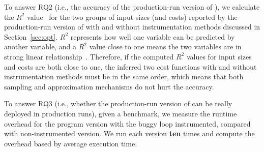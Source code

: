 To answer RQ2 (i.e., the accuracy of the production-run version of \Tool),
we calculate the $R^2$ value~\cite{rsquare} 
for the two groups of input sizes (and costs) reported by 
the production-run version of \Tool with and without 
instrumentation methods discussed in Section~\ref{sec:opt}.
$R^2$ represents how well one variable can be predicted by another variable,
and a $R^2$ value close to one means the two variables are 
in strong linear relationship~\cite{rsquare-value}.
Therefore, if the computed $R^2$ values for input sizes and costs
are both close to one,
the inferred two cost functions with and without instrumentation 
methods must be in the same order, 
which means that both sampling and approximation mechanisms 
do not hurt the accuracy. 



To answer RQ3 (i.e., whether the production-run version of \Tool 
can be really deployed in production runs), given a benchmark,
we measure the runtime overhead for the program version 
with the buggy loop instrumented, compared with non-instrumented version. 
We run each version \textbf{ten} times and compute the overhead based 
by average execution time. 




